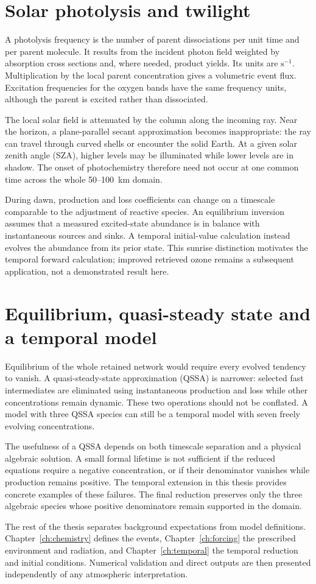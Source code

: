 \section{Solar photolysis and twilight}
A photolysis frequency is the number of parent dissociations per unit time and per parent molecule. It results from the incident photon field weighted by absorption cross sections and, where needed, product yields. Its units are $\mathrm{s^{-1}}$. Multiplication by the local parent concentration gives a volumetric event flux. Excitation frequencies for the oxygen bands have the same frequency units, although the parent is excited rather than dissociated.

The local solar field is attenuated by the column along the incoming ray. Near the horizon, a plane-parallel secant approximation becomes inappropriate: the ray can travel through curved shells or encounter the solid Earth. At a given solar zenith angle (SZA), higher levels may be illuminated while lower levels are in shadow. The onset of photochemistry therefore need not occur at one common time across the whole 50--100~km domain.

During dawn, production and loss coefficients can change on a timescale comparable to the adjustment of reactive species. An equilibrium inversion assumes that a measured excited-state abundance is in balance with instantaneous sources and sinks. A temporal initial-value calculation instead evolves the abundance from its prior state. This sunrise distinction motivates the temporal forward calculation; improved retrieved ozone remains a subsequent application, not a demonstrated result here.

\section{Equilibrium, quasi-steady state and a temporal model}
Equilibrium of the whole retained network would require every evolved tendency to vanish. A quasi-steady-state approximation (QSSA) is narrower: selected fast intermediates are eliminated using instantaneous production and loss while other concentrations remain dynamic. These two operations should not be conflated. A model with three QSSA species can still be a temporal model with seven freely evolving concentrations.

The usefulness of a QSSA depends on both timescale separation and a physical algebraic solution. A small formal lifetime is not sufficient if the reduced equations require a negative concentration, or if their denominator vanishes while production remains positive. The temporal extension in this thesis provides concrete examples of these failures. The final reduction preserves only the three algebraic species whose positive denominators remain supported in the domain.

The rest of the thesis separates background expectations from model definitions. Chapter~\ref{ch:chemistry} defines the events, Chapter~\ref{ch:forcing} the prescribed environment and radiation, and Chapter~\ref{ch:temporal} the temporal reduction and initial conditions. Numerical validation and direct outputs are then presented independently of any atmospheric interpretation.
